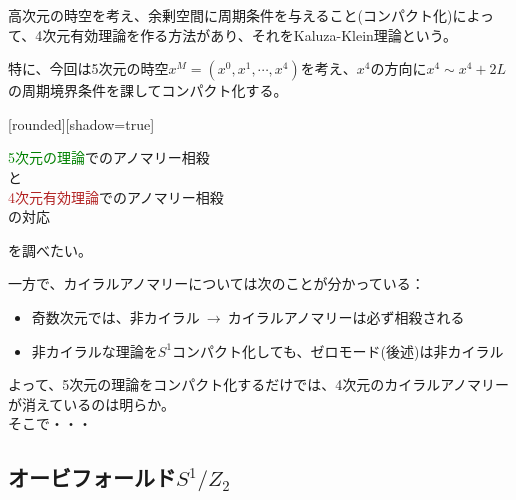\documentclass[
  unicode,a4paper,10pt,
  xcolor = {dvipsnames,svgnames},
  hyperref ={colorlinks=true,citecolor=Navy,linkcolor=NavyBlue,urlcolor=purple},
  ja=standard,lualatex
]{beamer}
\begin{document}
\begin{frame}{\subsecname}

  高次元の時空を考え、余剰空間に周期条件を与えること(コンパクト化)によって、4次元有効理論を作る方法があり、それをKaluza-Klein理論という。

  \vspace*{5pt}

  特に、今回は5次元の時空$x^{M}=(x^{0},x^{1},\cdots,x^{4})$を考え、$x^{4}$の方向に$x^{4}\sim x^{4}+2L$の周期境界条件を課してコンパクト化する。

  \pause
  \vspace*{10pt}

  [rounded][shadow=true]
  \begin{block}{}
    \centering
    \textcolor{Green}{5次元の理論}でのアノマリー相殺
    \\
    と
    \\
    \textcolor{FireBrick}{4次元有効理論}でのアノマリー相殺
    \\
    の対応
  \end{block}
  を調べたい。

\end{frame}


\begin{frame}

  一方で、カイラルアノマリーについては次のことが分かっている：

  \begin{itemize}
    \item 
    奇数次元では、非カイラル$\ \longrightarrow\ $カイラルアノマリーは必ず相殺される
    \item 
    非カイラルな理論を$S^{1}$コンパクト化しても、ゼロモード(後述)は非カイラル
  \end{itemize}

  \pause

  よって、5次元の理論をコンパクト化するだけでは、4次元のカイラルアノマリーが消えているのは明らか。\\

  そこで・・・  

\end{frame}

\subsection{オービフォールド\texorpdfstring{$S^{1}/Z_{2}$}{S1/Z2}}
\end{document}
